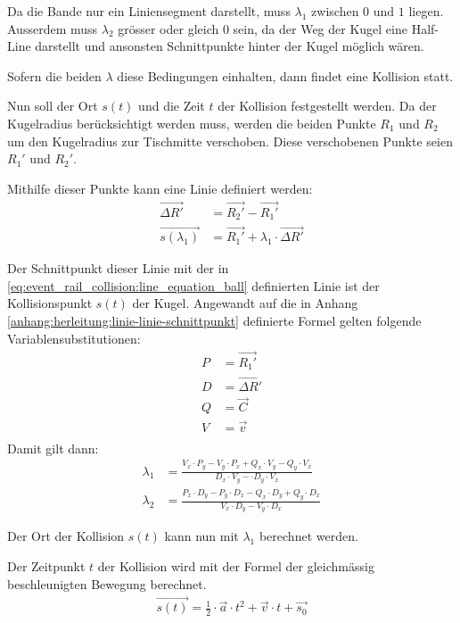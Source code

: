 Da die Bande nur ein Liniensegment darstellt, muss $\lambda_1$ zwischen $0$ und $1$ liegen.
Ausserdem muss $\lambda_2$ grösser oder gleich $0$ sein, da der Weg der Kugel eine Half-Line darstellt und ansonsten
Schnittpunkte hinter der Kugel möglich wären.

Sofern die beiden $\lambda$ diese Bedingungen einhalten, dann findet eine Kollision statt.

Nun soll der Ort $s(t)$ und die Zeit $t$ der Kollision
festgestellt werden. Da der Kugelradius berücksichtigt werden muss,
werden die beiden Punkte $R_1$ und $R_2$ um den Kugelradius zur Tischmitte verschoben.
Diese verschobenen Punkte seien $R_1'$ und $R_2'$.

Mithilfe dieser Punkte kann eine Linie definiert werden:
\begin{align}
    \vec{\Delta R'} &= \vec{R_2'} - \vec{R_1'}\\
    \vec{s(\lambda_1)} &= \vec{R_1'} + \lambda_1 \cdot \vec{\Delta R'}
\end{align}

Der Schnittpunkt dieser Linie mit der in \ref{eq:event_rail_collision:line_equation_ball} definierten Linie ist
der Kollisionspunkt $s(t)$ der Kugel.
Angewandt auf die in Anhang \ref{anhang:herleitung:linie-linie-schnittpunkt} definierte Formel gelten folgende
Variablensubstitutionen:
\begin{align}
    P &= \vec{R_1'}\\
    D &= \vec{\Delta R'}\\
    Q &= \vec{C}\\
    V &= \vec{v}\\
\end{align}
Damit gilt dann:
\begin{align}
    \lambda_1 &= \frac{V_x \cdot P_y - V_y \cdot P_x + Q_x \cdot V_y - Q_y \cdot V_x}{D_x \cdot V_y - \cdot D_y \cdot V_x}\\
    \lambda_2 &= \frac{P_x \cdot D_y - P_y \cdot D_x - Q_x \cdot D_y + Q_y \cdot D_x}{V_x \cdot D_y - V_y \cdot D_x}
\end{align}

Der Ort der Kollision $s(t)$ kann nun mit $\lambda_1$ berechnet werden.

Der Zeitpunkt $t$ der Kollision wird mit der Formel der gleichmässig beschleunigten Bewegung berechnet.
\begin{align}
    \vec{s(t)} = \frac{1}{2} \cdot \vec{a} \cdot t^2 + \vec{v} \cdot t + \vec{s_0}
\end{align}

